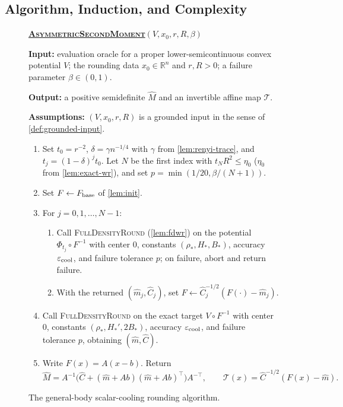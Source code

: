 \documentclass[11pt]{article}
\numberwithin{equation}{section}
\newenvironment{fminipage}%
  {\begin{Sbox}\begin{minipage}}%
  {\end{minipage}\end{Sbox}\fbox{\TheSbox}}
\newenvironment{algbox}[0]{\vskip 0.2in
\noindent
\begin{fminipage}{6.3in}
}{
\end{fminipage}
\vskip 0.2in
}
\theoremstyle{definition}
\newcommand{\eps}{\varepsilon}
\newcommand{\R}{\mathbb{R}}
\newcommand{\algname}[1]{\textnormal{\textsc{#1}}}
\begin{document}
\subsection{Algorithm, Induction, and Complexity}
\label{sec:general-algorithm}

\begin{figure}[H]
\begin{algbox}
\textbf{\uline{\algname{AsymmetricSecondMoment}}}$(V,x_0,r,R,\beta)$

\textbf{Input:} evaluation oracle for a proper lower-semicontinuous convex
potential $V$; the rounding data
$x_0\in\R^n$ and
$r,R>0$; a failure parameter
$\beta\in(0,1)$.

\textbf{Output:} a positive semidefinite $\widehat M$ and an invertible affine
map
$\mathcal T$.

\textbf{Assumptions:} $(V,x_0,r,R)$ is a grounded input in the sense of
\cref{def:grounded-input}.

\begin{enumerate}[leftmargin=*,itemsep=2pt]
\item Set $t_0=r^{-2}$,
  $\delta=\gamma n^{-1/4}$ with
  $\gamma$ from \cref{lem:renyi-trace}, and
  $t_j=(1-\delta)^jt_0$.
  Let $N$ be the first index with
  $t_NR^2\leq\eta_0$
  ($\eta_0$ from \cref{lem:exact-wr}), and set
  $p=\min(1/20,\beta/(N+1))$.
\item Set $F\leftarrow F_{\rm base}$ of \cref{lem:init}.
\item For $j=0,1,\dots,N-1$:
  \begin{enumerate}[itemsep=1pt]
\item Call \algname{FullDensityRound} (\cref{lem:fdwr}) on the potential
  $\Phi_{t_j}\circ F^{-1}$ with center
  $0$, constants
  $(\rho_*,H_*,B_*)$, accuracy
  $\eps_{\rm cool}$, and failure tolerance
  $p$; on failure, abort and return failure.
\item With the returned $(\widehat m_j,\widehat C_j)$, set
  $F\leftarrow\widehat C_j^{-1/2}(F(\cdot)-\widehat m_j)$.
  \end{enumerate}
\item Call \algname{FullDensityRound} on the exact target $V\circ F^{-1}$ with
  center
  $0$, constants
  $(\rho_*,H_*',2B_*)$, accuracy
  $\eps_{\rm cool}$, and failure tolerance
  $p$, obtaining
  $(\widehat m,\widehat C)$.
\item Write $F(x)=A(x-b)$.
  Return
  \[
\widehat M =A^{-1}\bigl(\widehat C+(\widehat m+Ab)(\widehat m+Ab)^\top\bigr) A^{-\top},
\qquad
\mathcal T(x)=\widehat C^{-1/2}(F(x)-\widehat m).
  \]
\end{enumerate}
\end{algbox}
\caption{The general-body scalar-cooling rounding algorithm.}
\label{fig:asymmetric-second-moment}
\end{figure}
\end{document}
